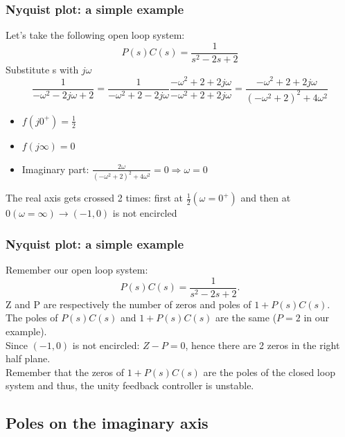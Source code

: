 \begin{frame}
	\frametitle{Nyquist plot: a simple example}
	Let's take the following open loop system: $$P(s)C(s)=\frac{1}{s^2-2s+2}$$
	Substitute s with $j\omega$  $$\frac{1}{-\omega^2-2j\omega+2}=\frac{1}{-\omega^2+2-2j\omega}\frac{-\omega^2+2+2j\omega}{-\omega^2+2+2j\omega}=\frac{-\omega^2+2+2j\omega}{(-\omega^2+2)^2+4\omega^2}$$
	\vspace{-2ex}
	\begin{itemize}
		\item $f(j0^+)=\frac{1}{2}$
		\item $f(j\infty)=0$
		\item Imaginary part: $\frac{2\omega}{(-\omega^2+2)^2+4\omega^2}=0\Rightarrow\omega=0$
	\end{itemize} 
	The real axis gets crossed 2 times: first at $\frac{1}{2} (\omega=0^+)$ and then at $0 (\omega=\infty) \rightarrow (-1,0)$ is not encircled
\end{frame}

\begin{frame}
	\frametitle{Nyquist plot: a simple example}
	Remember our open loop system: $$P(s)C(s)=\frac{1}{s^2-2s+2}.$$
	Z and P are respectively the number of zeros and poles of $1+P(s)C(s)$.\\
	The poles of $P(s)C(s)$ and $1+P(s)C(s)$ are the same ($P=2$ in our example).\\
	Since $(-1,0)$ is not encircled: $Z-P=0$, hence there are 2 zeros in the right half plane.\\
	Remember that the zeros of $1+P(s)C(s)$ are the poles of the closed loop system and thus, the unity feedback controller is unstable.
\end{frame}

\subsection{Poles on the imaginary axis}

